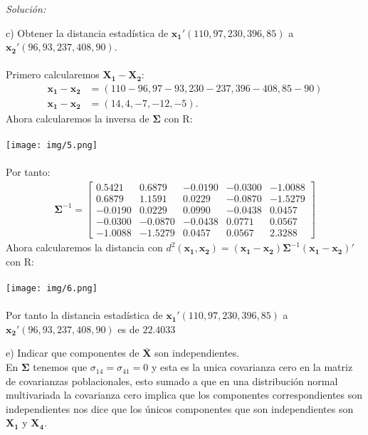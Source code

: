 \documentclass[12pt]{article}
\newenvironment{sol}
    {\emph{Solución:}
    }
    {
    }
\begin{document}
\begin{sol}
c) Obtener la distancia estadística de $\mathbf{x_1}'(110, 97, 230, 396, 85)$ a $\mathbf{x_2}'(96, 93, 237, 408, 90)$. \\\\
Primero calcularemos  \(\mathbf{X_1} - \mathbf{X_2}\):
\begin{align*}
\mathbf{x_1} - \mathbf{x_2} &= (110 - 96, 97 - 93, 230 - 237, 396 - 408, 85 - 90) \\
\mathbf{x_1} - \mathbf{x_2}&= (14, 4, -7, -12, -5).
\end{align*}
Ahora calcularemos la inversa de $\mathbf{\Sigma}$ con R: \\\\
\texttt{[image: img/5.png]}\\\\
Por tanto:
\begin{align*}
\mathbf{\Sigma}^{-1} = \begin{bmatrix}
  0.5421 &  0.6879 & -0.0190 & -0.0300 & -1.0088 \\
  0.6879 &  1.1591 &  0.0229 & -0.0870 & -1.5279 \\
 -0.0190 &  0.0229 &  0.0990 & -0.0438 &  0.0457 \\
 -0.0300 & -0.0870 & -0.0438 &  0.0771 &  0.0567 \\
 -1.0088 & -1.5279 &  0.0457 &  0.0567 &  2.3288
\end{bmatrix}
\end{align*}
Ahora calcularemos la distancia con $d^2(\mathbf{x_1,x_2})=(\mathbf{x_1-x_2})\mathbf{\Sigma}^{-1}(\mathbf{x_1-x_2})'$ con R:\\\\
\texttt{[image: img/6.png]}\\\\
Por tanto la distancia estadística de $\mathbf{x_1}'(110, 97, 230, 396, 85)$ a $\mathbf{x_2}'(96, 93, 237, 408, 90)$ es de $22.4033$ 

\pagebreak

e) Indicar que componentes de $\mathbf{\bar{X}}$ son independientes.\\ 
En $\mathbf{\Sigma}$ tenemos que $\sigma_{14} = \sigma_{41} = 0$ y esta es la unica covarianza cero en la matriz de covarianzas poblacionales, esto sumado a que en una distribución normal multivariada la covarianza cero implica que los componentes correspondientes son independientes nos dice que los únicos componentes que son independientes son $\mathbf{X_1}$ y $\mathbf{X_4}$.
\end{sol}
\end{document}
